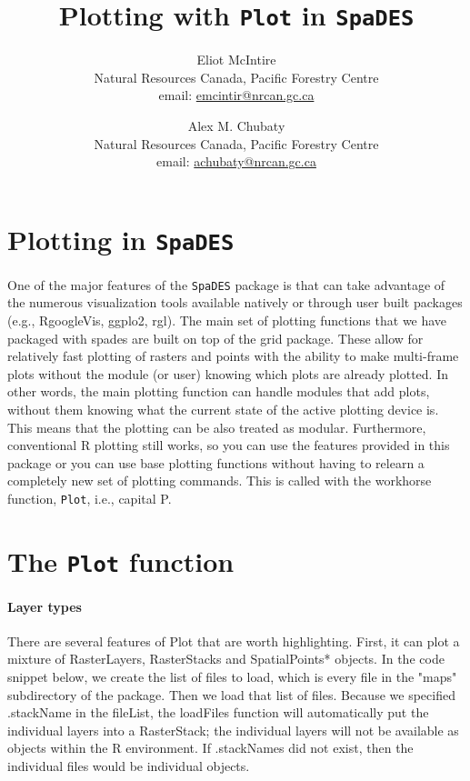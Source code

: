 \documentclass{article}
\title{Plotting with \texttt{Plot} in \texttt{SpaDES}}
\author{
  Eliot McIntire\\
	\small{Natural Resources Canada, Pacific Forestry Centre}\\
	\small{email: \href{mailto:emcintir@nrcan.gc.ca}{emcintir@nrcan.gc.ca}}
  \and
  Alex M. Chubaty\\
  \small{Natural Resources Canada, Pacific Forestry Centre}\\
  \small{email: \href{mailto:achubaty@nrcan.gc.ca}{achubaty@nrcan.gc.ca}}
}
\begin{document}


\maketitle

\tableofcontents

\newpage

\section{Plotting in \texttt{SpaDES}}

\paragraph{}
One of the major features of the \texttt{SpaDES} package is that can take advantage of the numerous visualization tools available natively or through user built packages (e.g., RgoogleVis, ggplo2, rgl). The main set of plotting functions that we have packaged with spades are built on top of the grid package. These allow for relatively fast plotting of rasters and points with the ability to make multi-frame plots without the module (or user) knowing which plots are already plotted. In other words, the main plotting function can handle modules that add plots, without them knowing what the current state of the active plotting device is. This means that the plotting can be also treated as modular.  Furthermore, conventional R plotting still works, so you can use the features provided in this package or you can use base plotting functions without having to relearn a completely new set of plotting commands. This is called with the workhorse function, \texttt{Plot}, i.e., capital P.

\section{The \texttt{Plot} function}
\paragraph{Layer types}
There are several features of Plot that are worth highlighting. First, it can plot a mixture of RasterLayers, RasterStacks and SpatialPoints* objects. In the code snippet below, we create the list of files to load, which is every file in the "maps" subdirectory of the package. Then we load that list of files. Because we specified .stackName in the fileList, the loadFiles function will automatically put the individual layers into a RasterStack; the individual layers will not be available as objects within the R environment. If .stackNames did not exist, then the individual files would be individual objects.
\end{document}
